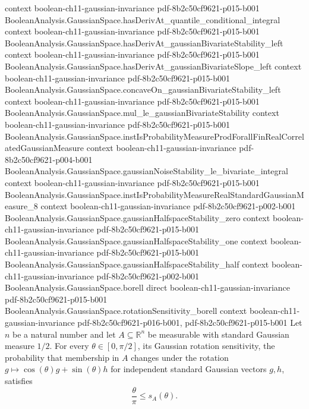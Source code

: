 \begin{theorem}
  {context}
  {boolean-ch11-gaussian-invariance}
  {pdf-8b2c50cf9621-p015-b001}
\proofstep
  {BooleanAnalysis.GaussianSpace.hasDerivAt_quantile_conditional_integral}
  {context}
  {boolean-ch11-gaussian-invariance}
  {pdf-8b2c50cf9621-p015-b001}
\proofstep
  {BooleanAnalysis.GaussianSpace.hasDerivAt_gaussianBivariateStability_left}
  {context}
  {boolean-ch11-gaussian-invariance}
  {pdf-8b2c50cf9621-p015-b001}
\proofstep
  {BooleanAnalysis.GaussianSpace.hasDerivAt_gaussianBivariateSlope_left}
  {context}
  {boolean-ch11-gaussian-invariance}
  {pdf-8b2c50cf9621-p015-b001}
\proofstep
  {BooleanAnalysis.GaussianSpace.concaveOn_gaussianBivariateStability_left}
  {context}
  {boolean-ch11-gaussian-invariance}
  {pdf-8b2c50cf9621-p015-b001}
\proofstep
  {BooleanAnalysis.GaussianSpace.mul_le_gaussianBivariateStability}
  {context}
  {boolean-ch11-gaussian-invariance}
  {pdf-8b2c50cf9621-p015-b001}
\proofstep
  {BooleanAnalysis.GaussianSpace.instIsProbabilityMeasureProdForallFinRealCorrelatedGaussianMeasure}
  {context}
  {boolean-ch11-gaussian-invariance}
  {pdf-8b2c50cf9621-p004-b001}
\proofstep
  {BooleanAnalysis.GaussianSpace.gaussianNoiseStability_le_bivariate_integral}
  {context}
  {boolean-ch11-gaussian-invariance}
  {pdf-8b2c50cf9621-p015-b001}
\proofstep
  {BooleanAnalysis.GaussianSpace.instIsProbabilityMeasureRealStandardGaussianMeasure_8}
  {context}
  {boolean-ch11-gaussian-invariance}
  {pdf-8b2c50cf9621-p002-b001}
\proofstep
  {BooleanAnalysis.GaussianSpace.gaussianHalfspaceStability_zero}
  {context}
  {boolean-ch11-gaussian-invariance}
  {pdf-8b2c50cf9621-p015-b001}
\proofstep
  {BooleanAnalysis.GaussianSpace.gaussianHalfspaceStability_one}
  {context}
  {boolean-ch11-gaussian-invariance}
  {pdf-8b2c50cf9621-p015-b001}
\proofstep
  {BooleanAnalysis.GaussianSpace.gaussianHalfspaceStability_half}
  {context}
  {boolean-ch11-gaussian-invariance}
  {pdf-8b2c50cf9621-p002-b001}
\proofstep
  {BooleanAnalysis.GaussianSpace.borell}
  {direct}
  {boolean-ch11-gaussian-invariance}
  {pdf-8b2c50cf9621-p015-b001}
\proofstep
  {BooleanAnalysis.GaussianSpace.rotationSensitivity_borell}
  {context}
  {boolean-ch11-gaussian-invariance}
  {pdf-8b2c50cf9621-p016-b001,
    pdf-8b2c50cf9621-p015-b001}
Let $n$ be a natural number and let $A\subseteq\mathbb R^n$ be measurable with standard
Gaussian measure $1/2$. For every $\theta\in[0,\pi/2]$, its Gaussian rotation
sensitivity, the probability that membership in $A$ changes under the rotation
$g\mapsto\cos(\theta)g+\sin(\theta)h$ for independent standard Gaussian vectors $g,h$,
satisfies $$\frac{\theta}{\pi}\le s_A(\theta).$$
\end{theorem}
